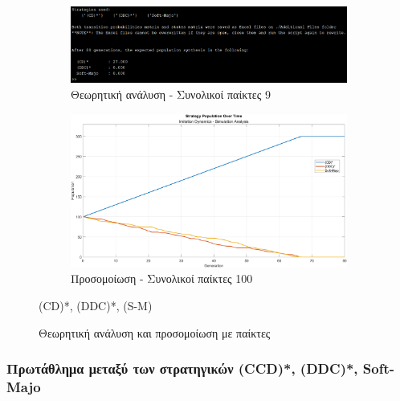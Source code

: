 \documentclass[a4paper,12pt]{article}
\begin{document}
\begin{figure}[h]
\centering

\begin{subfigure}[b]{0.9\textwidth}
    \centering
    \includegraphics[width=\textwidth]{Graphs/imi_the1.png}
    \caption{Θεωρητική ανάλυση - Συνολικοί παίκτες 9}
    \label{fig:imi_the1}
\end{subfigure}
\hfill
\vspace{1em}
\begin{subfigure}[b]{0.9\textwidth}
    \centering
    \includegraphics[width=\textwidth]{Graphs/imi_sim1.png}
    \caption{Προσομοίωση - Συνολικοί παίκτες 100}
    \label{fig:imi_sim1}
\end{subfigure}
\caption{Θεωρητική ανάλυση και προσομοίωση με παίκτες} \foreignlanguage{english}{(CD)*, (DDC)*, (S-M)}
\end{figure}


\subsubsection*{Πρωτάθλημα μεταξύ των στρατηγικών \foreignlanguage{english}{(CCD)*, (DDC)*, Soft-Majo}}
\end{document}
